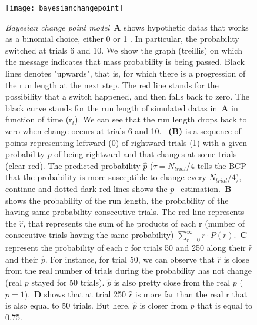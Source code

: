 \documentclass[profile,final,english, draft]{article}%
\newcommand{\seeFig}[1]{Figure~\ref{fig:#1}}
\begin{document}
\begin{figure}%
\begin{center}
    \texttt{[image: bayesianchangepoint]}
\end{center}
\caption{\emph{Bayesian change point model}~\textbf{A} shows hypothetic datas that works as a binomial choice, either 0 or 1 . In particular, the probability switched at trials 6 and 10. We show the graph (treillis) on which the message indicates that mass probability is being passed. Black lines denotes "upwards", that is, for which there is a progression of the run length at the next step. The red line stands for the possibility that a switch happened, and then falls back to zero. The black curve stands for the run length of simulated datas in~\textbf{A} in function of time (r$_t$). We can see that the run length drops back to zero when change occurs at trials 6 and 10.
~\textbf{(B)} is a sequence of points representing leftward (0) of rightward trials (1) with a given probability $p$ of being rightward and that changes at some trials (clear red). The predicted probability $\hat{p}$ ($\tau=N_{trial}/4$ tells the BCP that the probability is more susceptible to change every $N_{trial}/4$), continue and dotted dark red lines shows the $p$$-$estimation.~\textbf{B} shows the probability of the run length, the probability of the having same probability consecutive trials. The red line represents the $\hat{r}$, that represents the sum of he products of each r (number of consecutive trials having the same probability)  $\sum_{r=0}^\infty r \cdot P(r)$.~\textbf{C} represent the probability of each r for trials 50 and 250 along their $\hat{r}$ and their $\hat{p}$. For instance, for trial 50, we can observe that $\hat{r}$ is close from the real number of trials during the probability has not change (real $p$ stayed for 50 trials). $\hat{p}$ is also pretty close from the real $p$ ($p=1$).~\textbf{D} shows that at trial 250 $\hat{r}$ is more far than the real r that is also equal to 50 trials. But here, $\hat{p}$ is closer from $p$ that is equal to 0.75.
}
\label{fig:bayesianchangepoint}
\end{figure}
\end{document}
